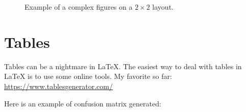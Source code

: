 \begin{figure}[!h]
\begin{subfigure}[t]{.5\textwidth}
  \end{subfigure}
  \caption{Example of a complex figures on a $2\times2$ layout.}
  \label{fig:drake}
\end{figure}

\section{Tables}
Tables can be a nightmare in LaTeX.
The easiest way to deal with tables in LaTeX is to use some online tools.
My favorite so far: \url{https://www.tablesgenerator.com/}

Here is an example of confusion matrix generated:
\begin{table}[!h]
\end{table}
